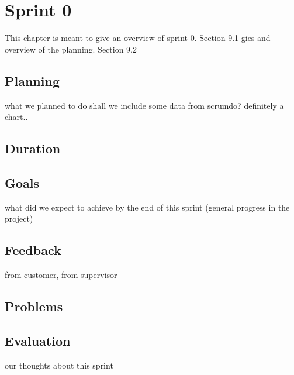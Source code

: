 
\chapter{Sprint 0} %

\label{Sprint 0} %

This chapter is meant to give an overview of sprint 0. 
Section 9.1 gies and overview of the planning.
Section 9.2

\section{Planning}
what we planned to do
shall we include some data from scrumdo? definitely a chart..
\section{Duration}
\section{Goals}
what did we expect to achieve by the end of this sprint (general progress in the project)
\section{Feedback}
from customer, from supervisor
\section{Problems}

\section{Evaluation}
our thoughts about this sprint
